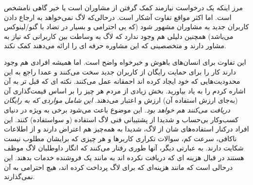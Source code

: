 مرز اینکه یک درخواست نیازمند کمک گرفتن از مشاوران است یا خیر گاهی
نامشخص است. اما اکثر مواقع تفاوت آشکار است.
درحالی‌که لاگ نمی‌خواهد به ارجاع دادن کاربران جدید به مشاوران مشهور
شود (که بی احترامی و بسیار در تضاد با گنو/لینوکس می‌باشد) همچنین
دلیلی هم وجود ندارد که لاگ به وساطت بین کاربرانی که نیاز به مشاور دارند
و متخصصینی که این مشاوره حرفه ای را ارائه می‌دهند کمک نکند.

\begin{caveat}
این تفاوت برای انسان‌های باهوش و خیرخواه واضح است.
اما همیشه افرادی هم وجود دارند کار را برای حمایت رایگان
از کاربران جدید سخت می‌کنند و عمدا راجع به این محدودیت‌هایی
که خود ایجاد کرده اند احمقانه عمل می‌کنند. نکته ای که قبل تر
به آن اشاره کردم را به یاد بیاورید. بخش زیادی از مردم
هر چیز را بر اساس قیمت‌گذاری آن (به‌جای ارزش استفاده آن)
ارزش و اعتبار می‌دهند.
{\itshape
این شامل مواردی که به رایگان دریافت می‌کنند هم خواهد بود.
}
این موضوع باعث می‌شود برخی به ویژه در دنیای کسب‌و‌کار بی‌حساب و شدیدا
از پشتیبانی فنی لاگ استفاده (و سواستفاده) کنند.
این افراد درکنار استفاده‌های شان از لاگ، شدیدا به همه‌چیز هم اعتراض
دارند و از اطلاعات ناکافی، سرعت کم، سوالات تکراری کاربر‌ها و
هر چیزی که برایشان مطلوب نیست شکایت دارند. به عبارتی دیگر،
آنها طوری رفتار می‌کنند که انگار داوطلبان لاگ موظف هستند در قبال
هزینه ای که دریافت نکرده اند به مانند یک فروشنده خدمات بدهند.
این درحالی است که مانند هزینه‌ای که برای لاگ پرداخت کرده اند،
هیچ احترامی به آن نمی‌گذارند.
\end{caveat}

